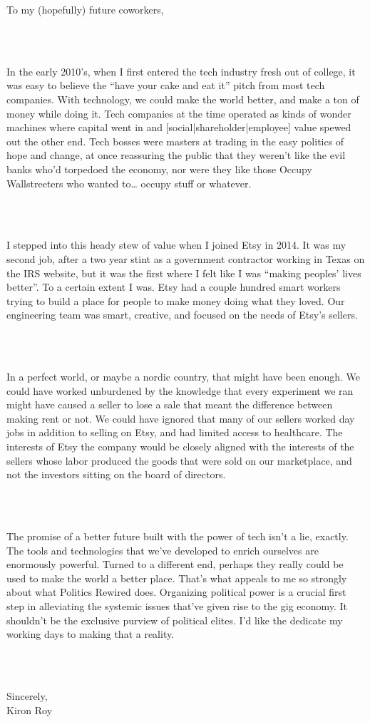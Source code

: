 \documentclass[9pt]{developercv} %
\begin{document}
\parbox{1\textwidth}{To my (hopefully) future coworkers,}\\
\vspace{0.5cm}\\
\parbox{1\textwidth}{\hspace{0.75cm}In the early 2010’s, when I first entered the tech industry fresh out of college, it was easy to believe the “have your cake and eat it” pitch from most tech companies. With technology, we could make the world better, and make a ton of money while doing it. Tech companies at the time operated as kinds of wonder machines where capital went in and [social|shareholder|employee] value spewed out the other end. Tech bosses were masters at trading in the easy politics of hope and change, at once reassuring the public that they weren’t like the evil banks who’d torpedoed the economy, nor were they like those Occupy Wallstreeters who wanted to… occupy stuff or whatever.}\\
\vspace{0.25cm}\\
\parbox{1\textwidth}{\hspace{0.75cm}I stepped into this heady stew of value when I joined Etsy in 2014. It was my second job, after a two year stint as a government contractor working in Texas on the IRS website, but it was the first where I felt like I was “making peoples’ lives better”. To a certain extent I was. Etsy had a couple hundred smart workers trying to build a place for people to make money doing what they loved. Our engineering team was smart, creative, and focused on the needs of Etsy’s sellers.}\\
\vspace{0.25cm}\\
\parbox{1\textwidth}{\hspace{0.75cm}In a perfect world, or maybe a nordic country, that might have been enough. We could have worked unburdened by the knowledge that every experiment we ran might have caused a seller to lose a sale that meant the difference between making rent or not. We could have ignored that many of our sellers worked day jobs in addition to selling on Etsy, and had limited access to healthcare. The interests of Etsy the company would be closely aligned with the interests of the sellers whose labor produced the goods that were sold on our marketplace, and not the investors sitting on the board of directors.}\\
\vspace{0.25cm}\\
\parbox{1\textwidth}{\hspace{0.75cm}The promise of a better future built with the power of tech isn’t a lie, exactly. The tools and technologies that we’ve developed to enrich ourselves are enormously powerful. Turned to a different end, perhaps they really could be used to make the world a better place. That’s what appeals to me so strongly about what Politics Rewired does. Organizing political power is a crucial first step in alleviating the systemic issues that’ve given rise to the gig economy. It shouldn’t be the exclusive purview of political elites. I’d like the dedicate my working days to making that a reality.}\\
\vspace{0.5cm}\\

\parbox{1\textwidth}{Sincerely,\\Kiron Roy}
\end{document}
